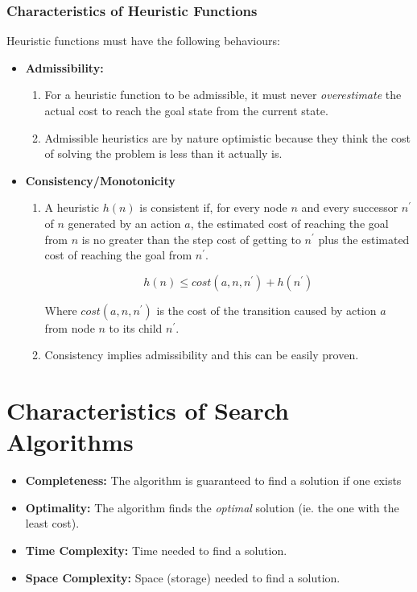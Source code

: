 \documentclass{article}
\theoremstyle{plain}
\theoremstyle{definition}
\begin{document}
\subsubsection{Characteristics of Heuristic Functions}
Heuristic functions must have the following behaviours:
\begin{itemize}
    \item \textbf{Admissibility:} 
    \begin{enumerate}
        \item For a heuristic function to be admissible, it must never \textit{overestimate} the actual cost to reach the goal state from the current state.
        
        \item Admissible heuristics are by nature optimistic because they think the cost of solving the problem is less than it actually is.
    \end{enumerate} 
    
    \item \textbf{Consistency/Monotonicity}
    \begin{enumerate}
        \item A heuristic $h(n)$ is consistent if, for every node $n$ and every successor $n^\prime$ of $n$ generated by an action $a$, the estimated cost of reaching the goal from $n$ is no greater than the step cost of getting to $n^\prime$ plus the estimated cost of reaching the goal from $n^\prime$.
        
        \begin{equation}
            h(n) \leq cost(a, n, n^\prime) + h(n^\prime)
        \end{equation}
        
        Where $cost(a, n, n^\prime)$ is the cost of the transition caused by action $a$ from node $n$ to its child $n^\prime$.
        
        \item Consistency implies admissibility and this can be easily proven. 
    \end{enumerate}
\end{itemize}

\section{Characteristics of Search Algorithms}

\begin{itemize}
    \item \textbf{Completeness:} The algorithm is guaranteed to find a solution if one exists
    
    \item \textbf{Optimality:} The algorithm finds the \textit{optimal} solution (ie. the one with the least cost). 
    
    \item \textbf{Time Complexity:} Time needed to find a solution.
    
    \item \textbf{Space Complexity:} Space (storage) needed to find a solution.
\end{itemize}
\end{document}
